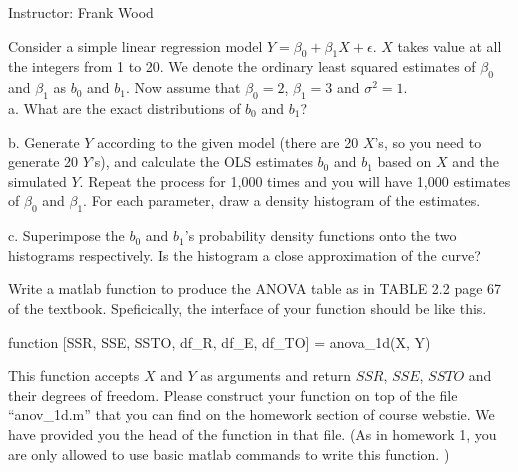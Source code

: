 \documentclass[12pt]{article}
\begin{document}
 \begin{center}
  Instructor: Frank Wood
 \end{center}
{}
\finishfirstpage



 {
 
  Consider a simple linear regression model $Y=\beta_0+\beta_1X+\epsilon$. $X$ takes value at all the integers from 1 to 20. We denote the ordinary least squared estimates of $\beta_0$ and $\beta_1$ as $b_0$ and $b_1$. Now assume that $\beta_0=2$, $\beta_1=3$ and $\sigma^2=1$.\\
 a. What are the exact distributions of $b_0$ and $b_1$?

 b. Generate $Y$ according to the given model (there are 20 $X$'s, so you need to generate 20 $Y$'s), and calculate the OLS estimates $b_0$ and $b_1$ based on $X$ and the simulated $Y$. Repeat the process for 1,000 times and you will have 1,000 estimates of $\beta_0$ and $\beta_1$. For each parameter, draw a density histogram of the estimates.

 c. Superimpose the $b_0$ and $b_1$'s probability density functions onto the two histograms respectively. Is the histogram a
 close approximation of the curve?
   }
 { \vfill
  \answer
} { }

 {
Write a matlab function to produce the ANOVA table as in TABLE 2.2 page 67 of the textbook. Speficically, the interface of your function should be like this.

\begin{center}                function [SSR, SSE, SSTO, df\_R, df\_E, df\_TO] = anova\_1d(X, Y)
\end{center}

This function accepts $X$ and $Y$ as arguments and return $SSR$, $SSE$, $SSTO$ and their degrees of freedom. Please construct your function on top of the file ``anov\_1d.m'' that you can find on the homework section of course webstie. We have provided you the head of the function in that file. (As in homework 1, you are only allowed to use basic matlab commands to write this function. )

  }
 { \vfill
  \answer
} { }
\end{document}

